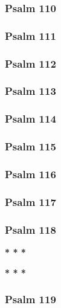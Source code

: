 \documentclass[10pt]{extarticle}
\begin{document}
\begin{multicols}{2}
\subsubsection{Psalm 110}

\newpage

\subsubsection{Psalm 111}

\newpage

\subsubsection{Psalm 112}

\newpage

\subsubsection{Psalm 113}

\newpage

\subsubsection{Psalm 114}

\newpage

\subsubsection{Psalm 115}

\newpage

\subsubsection{Psalm 116}

\newpage

\subsubsection{Psalm 117}

\newpage

\subsubsection{Psalm 118}

\centerline{\textbf{* * *}}


\centerline{\textbf{* * *}}

\newpage

\subsubsection{Psalm 119}

\newpage


\end{multicols}
\end{document}
